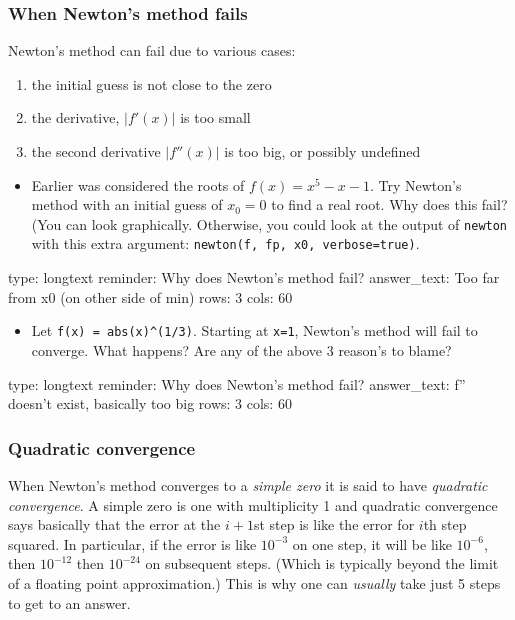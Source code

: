 \documentclass[12pt]{article}
\begin{document}
\subsubsection{When Newton's method fails}

Newton's method can fail due to various cases:

\begin{enumerate}
\def\labelenumi{\arabic{enumi})}
\item
  the initial guess is not close to the zero
\item
  the derivative, $\vert f'(x)\vert $ is too small
\item
  the second derivative $\vert f''(x)\vert $ is too big, or possibly
  undefined
\end{enumerate}

\begin{itemize}
\itemsep1pt\parskip0pt
\item
  Earlier was considered the roots of $f(x) = x^5 - x - 1$. Try Newton's
  method with an initial guess of $x_0=0$ to find a real root. Why does
  this fail? (You can look graphically. Otherwise, you could look at the
  output of \texttt{newton} with this extra argument:
  \texttt{newton(f, fp, x0, verbose=true)}.
\end{itemize}

\begin{answer}
type: longtext
reminder: Why does Newton's method fail?
answer_text: Too far from x0 (on other side of min) 
rows: 3
cols: 60
\end{answer}

\begin{itemize}
\itemsep1pt\parskip0pt
\item
  Let \texttt{f(x) = abs(x)\^{}(1/3)}. Starting at \texttt{x=1},
  Newton's method will fail to converge. What happens? Are any of the
  above 3 reason's to blame?
\end{itemize}

\begin{answer}
type: longtext
reminder: Why does Newton's method fail?
answer_text: f'' doesn't exist, basically too big 
rows: 3
cols: 60
\end{answer}

\subsubsection{Quadratic convergence}

When Newton's method converges to a \emph{simple zero} it is said to
have \emph{quadratic convergence}. A simple zero is one with
multiplicity 1 and quadratic convergence says basically that the error
at the $i+1$st step is like the error for $i$th step squared. In
particular, if the error is like $10^{-3}$ on one step, it will be like
$10^{-6}$, then $10^{-12}$ then $10^{-24}$ on subsequent steps. (Which
is typically beyond the limit of a floating point approximation.) This
is why one can \emph{usually} take just 5 steps to get to an answer.
\end{document}
